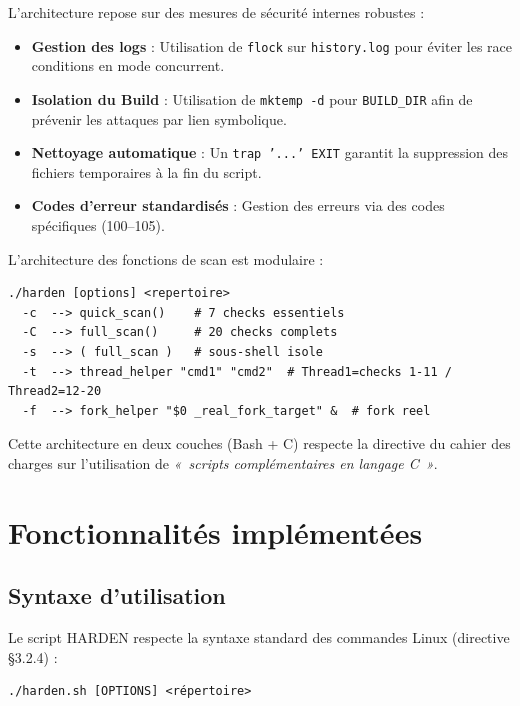 \documentclass[12pt,a4paper]{article}
\newcommand{\cmd}[1]{\texttt{\textcolor{codeText}{#1}}}
\newcommand{\fichier}[1]{\texttt{\textcolor{bleuENSET}{#1}}}
\begin{document}
L'architecture repose sur des mesures de sécurité internes robustes :
\begin{itemize}[topsep=2pt, itemsep=2pt]
  \item \textbf{Gestion des logs} : Utilisation de \cmd{flock} sur \fichier{history.log} pour éviter les race conditions en mode concurrent.
  \item \textbf{Isolation du Build} : Utilisation de \cmd{mktemp -d} pour \cmd{BUILD\_DIR} afin de prévenir les attaques par lien symbolique.
  \item \textbf{Nettoyage automatique} : Un \cmd{trap '...' EXIT} garantit la suppression des fichiers temporaires à la fin du script.
  \item \textbf{Codes d'erreur standardisés} : Gestion des erreurs via des codes spécifiques (100--105).
\end{itemize}

L'architecture des fonctions de scan est modulaire :

\begin{lstlisting}[style=bash]
./harden [options] <repertoire>
  -c  --> quick_scan()    # 7 checks essentiels
  -C  --> full_scan()     # 20 checks complets
  -s  --> ( full_scan )   # sous-shell isole
  -t  --> thread_helper "cmd1" "cmd2"  # Thread1=checks 1-11 / Thread2=12-20
  -f  --> fork_helper "$0 _real_fork_target" &  # fork reel
\end{lstlisting}

Cette architecture en deux couches (Bash + C) respecte la directive du cahier des charges sur l'utilisation de \textit{«~scripts complémentaires en langage C~»}.

\newpage

\section{Fonctionnalités implémentées}

\subsection{Syntaxe d'utilisation}

Le script HARDEN respecte la syntaxe standard des commandes Linux (directive §3.2.4) :

\begin{lstlisting}[style=bash]
./harden.sh [OPTIONS] <répertoire>
\end{lstlisting}
\end{document}
